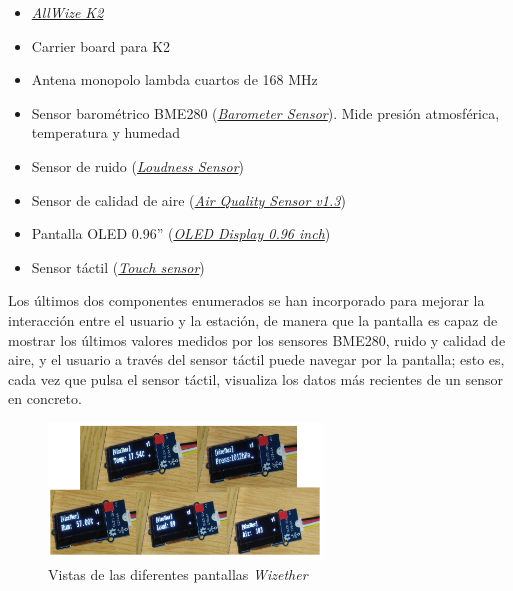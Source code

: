 \documentclass[12pt]{article}
\begin{document}
\begin{itemize}
	\item \href{https://www.allwize.io/product-page/the-allwize-k2}{\textit{AllWize K2}}
	\item Carrier board para K2
	\item Antena monopolo lambda cuartos de 168 MHz
	\item Sensor barométrico BME280 (\href{https://wiki.seeedstudio.com/Grove-Barometer_Sensor-BME280/}{\textit{Barometer Sensor}}). Mide presión atmosférica, temperatura y humedad
	\item Sensor de ruido (\href{https://wiki.seeedstudio.com/Grove-Loudness_Sensor/}{\textit{Loudness Sensor}})
	\item Sensor de calidad de aire (\href{https://wiki.seeedstudio.com/Grove-Air_Quality_Sensor_v1.3/}{\textit{Air Quality Sensor v1.3}})
	\item Pantalla OLED 0.96'' (\href{https://wiki.seeedstudio.com/Grove-OLED_Display_0.96inch/}{\textit{OLED Display 0.96 inch}})
	\item Sensor táctil (\href{https://wiki.seeedstudio.com/Grove-Touch_Sensor/}{\textit{Touch sensor}})
\end{itemize}

\noindent Los últimos dos componentes enumerados se han incorporado para mejorar la interacción entre el usuario y la estación, de manera que la pantalla es capaz de mostrar los últimos valores medidos por los sensores BME280, ruido y calidad de aire, y el usuario a través del sensor táctil puede navegar por la pantalla; esto es, cada vez que pulsa el sensor táctil, visualiza los datos más recientes de un sensor en concreto. \\

\begin{figure}[h]
	\begin{center}
		\includegraphics[width=0.65\textwidth]{img/Display_Wizether.png}
		\caption{Vistas de las diferentes pantallas \textit{Wizether}}
	\end{center}
\end{figure}
\end{document}
